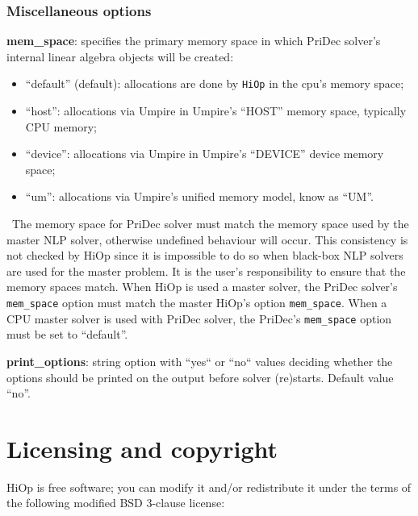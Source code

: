 \documentclass[11pt]{article}
\newcounter{line}
\newcommand{\warningSymbol}{\raisebox{0.9\depth}{\danger}}
\newcommand{\warningcp}[1]{%
        \smallskip \noindent \textcolor{warningColorText}{\warningSymbol{}}\,\textbf{#1} %
    }
\newcommand{\Hi}{\texttt{HiOp}\xspace}
\begin{document}
%

\subsubsection{Miscellaneous options}


\noindent \textbf{mem\_space}: specifies the primary memory space in which PriDec solver's internal linear algebra objects will be created:
\begin{itemize}
\item ``default'' (default): allocations are done by \Hi in the cpu's memory space;
\item ``host'':  allocations via Umpire in Umpire's ``HOST'' memory space, typically CPU memory;
\item ``device'': allocations via Umpire in Umpire's ``DEVICE'' device memory space;
\item ``um'': allocations via Umpire's unified memory model, know as ``UM''.
\end{itemize}
\warningcp{} The memory space for PriDec solver must match the memory space used by the master NLP solver, otherwise undefined behaviour will occur. This consistency is not checked by HiOp since it is impossible to do so when black-box NLP solvers are used for the master problem. It is the user's responsibility to ensure that the memory spaces match. When HiOp is used a master solver, the PriDec solver's \texttt{mem\_space} option must match the master HiOp's option \texttt{mem\_space}. When a CPU master solver is used with PriDec solver, the PriDec's \texttt{mem\_space} option must be set to ``default''.


\medskip

\noindent \textbf{print\_options}: string option with ``yes`` or ``no`` values deciding whether the options should be printed on the output before solver (re)starts. Default value ``no''.

%

\section{Licensing and copyright}
HiOp is free software; you can modify it and/or redistribute it under the terms of the following  modified BSD 3-clause license:
\end{document}
